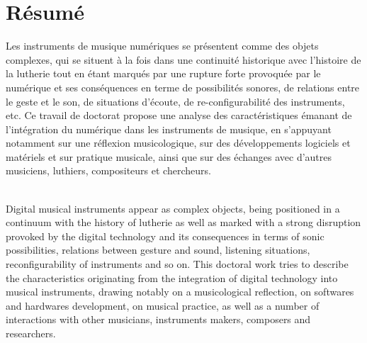 %
\chapter*{Résumé}
\label{sec:abstract}
\vspace*{-10mm}

\noindent Les instruments de musique numériques se présentent comme des objets complexes, qui se situent à la fois dans une continuité historique avec l'histoire de la lutherie tout en étant marqués par une rupture forte provoquée par le numérique et ses conséquences en terme de possibilités sonores, de relations entre le geste et le son, de situations d'écoute, de re-configurabilité des instruments, etc. Ce travail de doctorat propose une analyse des caractéristiques émanant de l'intégration du numérique dans les instruments de musique, en s'appuyant notamment sur une réflexion musicologique, sur des développements logiciels et matériels et sur pratique musicale, ainsi que sur des échanges avec d'autres musiciens, luthiers, compositeurs et chercheurs.

\vspace*{20mm}

\label{sec:abstract-diff} \\

\noindent Digital musical instruments appear as complex objects, being positioned in a continuum with the history of lutherie as well as marked with a strong disruption provoked by the digital technology and its consequences in terms of sonic possibilities, relations between gesture and sound, listening situations, reconfigurability of instruments and so on. This doctoral work tries to describe the characteristics originating from the integration of digital technology into musical instruments, drawing notably on a musicological reflection, on softwares and hardwares development, on musical practice, as well as a number of interactions with other musicians, instruments makers, composers and researchers.
